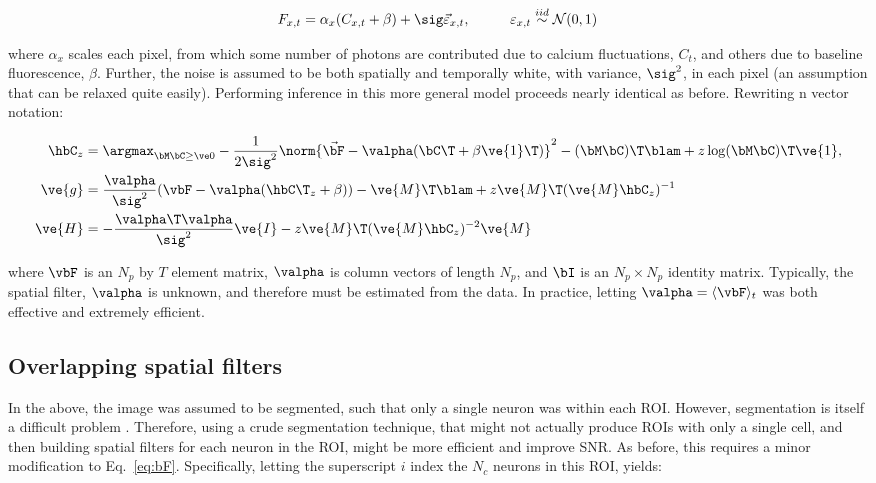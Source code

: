 \begin{align} \label{eq:bF}
F_{x,t} &= \alpha_x (C_{x,t} + \beta) +  \sig \vec{\varepsilon}_{x,t}, \qquad &\varepsilon_{x,t} \overset{iid}{\sim} \mathcal{N}(0,1)   
\end{align}

\noindent where $\alpha_x$ scales each pixel, from which some number of photons are contributed due to calcium fluctuations, $C_t$, and others due to baseline fluorescence, $\beta$.  Further, the noise is assumed to be both spatially and temporally white, with variance, $\sig^2$, in each pixel (an assumption that can be relaxed quite easily).  Performing inference in this more general model proceeds nearly identical as before. Rewriting n vector notation:

\begin{align} 
\hbC_{\zzz} 
&= \az  -\frac{1}{2 \sig^2} \norm{\vec{\bF} - \valpha (\bC\T +\beta\ve{1}\T)}^2 - (\bM \bC )\T \blam  + \zzz \log(\bM \bC)\T\ve{1},  \label{eq:eta4}\\
\ve{g} &= \frac{\valpha}{\sig^2}(\vbF -\valpha({\hbC\T}_{\zzz} + \beta)) - \ve{M}\T\blam + \zzz \ve{M}\T (\ve{M} \hbC_{\zzz})^{-1} \label{eq:g2} \\
\ve{H} &= -\frac{\valpha\T \valpha}{\sig^2} \ve{I} - \zzz \ve{M}\T (\ve{M} \hbC_{\zzz})^{-2} \ve{M} \label{eq:H2}
\end{align}

\noindent where $\vbF$ is an $N_p$ by $T$ element matrix, $\valpha$ is column vectors of length $N_p$, and $\bI$ is an $N_p \times N_p$ identity matrix.  Typically, the spatial filter, $\valpha$ is unknown, and therefore must be estimated from the data.  In practice, letting $\valpha=\langle \vbF \rangle_t$ was both effective and extremely efficient.




\subsection{Overlapping spatial filters} \label{sec:methods:overlapping}

In the above, the image was assumed to be segmented, such that only a single neuron was within each ROI.  However, segmentation is itself a difficult problem \cite{}.  Therefore, using a crude segmentation technique, that might not actually produce ROIs with only a single cell, and then building spatial filters for each neuron in the ROI, might be more efficient and improve SNR.  As before, this requires a minor modification to Eq.~\eqref{eq:bF}.  Specifically, letting the superscript $i$ index the $N_c$ neurons in this ROI, yields:  

